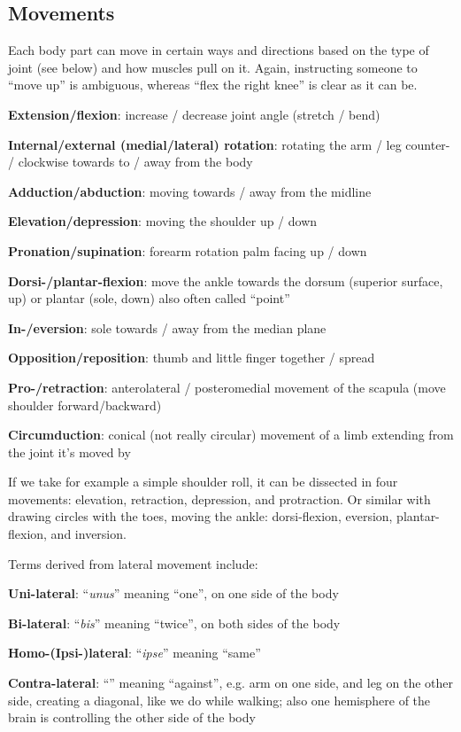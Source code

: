 \subsection{Movements}

Each body part can move in certain ways and directions based on the type of joint (see below) and how muscles pull on it.
Again, instructing someone to ``move up'' is ambiguous, whereas ``flex the right knee'' is clear as it can be.

\begin{itemize*}
    \item \textbf{Extension/flexion}: increase / decrease joint angle (stretch / bend)
    \item \textbf{Internal/external (medial/lateral) rotation}: rotating the arm / leg counter- / clockwise towards to / away from the body
    \item \textbf{Adduction/abduction}: moving towards / away from the midline
    \item \textbf{Elevation/depression}: moving the shoulder up / down
    \item \textbf{Pronation/supination}: forearm rotation palm facing up / down
    \item \textbf{Dorsi-/plantar-flexion}: move the ankle towards the dorsum (superior surface, up) or plantar (sole, down) also often called ``point''
    \item \textbf{In-/eversion}: sole towards / away from the median plane
    \item \textbf{Opposition/reposition}: thumb and little finger together / spread
    \item \textbf{Pro-/retraction}: anterolateral / posteromedial movement of the scapula (move shoulder forward/backward)
    \item \textbf{Circumduction}: conical (not really circular) movement of a limb extending from the joint it's moved by
\end{itemize*}

If we take for example a simple shoulder roll, it can be dissected in four movements: elevation, retraction, depression, and protraction.
Or similar with drawing circles with the toes, moving the ankle: dorsi-flexion, eversion, plantar-flexion, and inversion.

Terms derived from lateral movement include:

\begin{itemize*}
    \item \textbf{Uni-lateral}: ``\textit{unus}'' meaning ``one'', on one side of the body
    \item \textbf{Bi-lateral}: ``\textit{bis}'' meaning ``twice'', on both sides of the body
    \item \textbf{Homo-(Ipsi-)lateral}: ``\textit{ipse}'' meaning ``same''
    \item \textbf{Contra-lateral}: ``'' meaning ``against'', e.g. arm on one side, and leg on the other side, creating a diagonal, like we do while walking; also one hemisphere of the brain is controlling the other side of the body
\end{itemize*}


